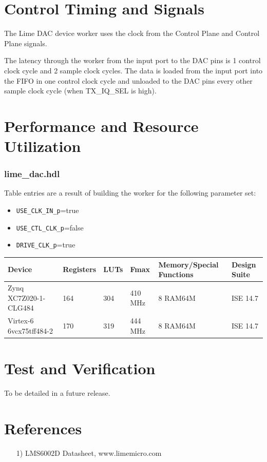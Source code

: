 \documentclass{article}
\def\comp{lime\_dac}
\begin{document}
		\section*{Control Timing and Signals}
		The Lime DAC device worker uses the clock from the Control Plane and Control Plane signals.\par\bigskip
		\noindent The latency through the worker from the input port to the DAC pins is 1 control clock cycle and 2 sample clock cycles. The data is loaded from the input port into the FIFO in one control clock cycle and unloaded to the DAC pins every other sample clock cycle (when TX\_IQ\_SEL is high).

		\section*{Performance and Resource Utilization}
		\subsubsection*{\comp.hdl}
		Table entries are a result of building the worker for the following parameter set:\
		\begin{itemize}
		\item \verb+USE_CLK_IN_p+=true
		\item \verb+USE_CTL_CLK_p+=false
		\item \verb+DRIVE_CLK_p+=true
		\end{itemize}
		\begin{scriptsize}
		\begin{tabular}{|M{4.5cm}|M{1cm}|M{1cm}|M{1.5cm}|M{2cm}|M{2.5cm}|}
		\hline
		Device                & Registers & LUTs & Fmax    & Memory/Special Functions & Design Suite \\
		\hline
		Zynq XC7Z020-1-CLG484 & 164       & 304  & 410 MHz & 8 RAM64M                 & ISE 14.7     \\
		\hline
		Virtex-6 6vcx75tff484-2 & 170       & 319  & 444 MHz & 8 RAM64M                 & ISE 14.7     \\
		\hline
	\end{tabular}
	\end{scriptsize}

	\section*{Test and Verification}
	\begin{flushleft}
	 To be detailed in a future release.
	\end{flushleft}
	\section*{References}
	\begin{flushleft}
		\begin{itemize}
			\item[1)] LMS6002D Datasheet, www.limemicro.com
		\end{itemize}
	\end{flushleft}
\end{document}
